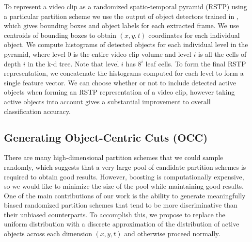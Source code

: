 \documentclass{bmvc2k}
\begin{document}
  To represent a video clip as a randomized spatio-temporal pyramid (RSTP)
  using a particular partition scheme we use the output of object detectors
  trained in \cite{Ramanan12}, which gives bounding boxes and object
  labels for each extracted frame. We use centroids of bounding boxes to
  obtain $(x,y,t)$ coordinates for each individual object.
  We compute histograms of detected
  objects for each individual level in the pyramid,
  where level 0 is the entire video clip volume and level $i$ is all the
  cells of depth $i$ in the k-d tree. 
  Note that level $i$ has $8^i$ leaf
  cells. To form the final RSTP representation, we concatenate the
  histograms computed for each level to form a single feature vector.
  We can choose whether or not to include detected active objects when
  forming an RSTP representation of a video clip, however taking active
  objects into account gives a substantial improvement to overall
  classification accuracy.
  
  \subsection{Generating Object-Centric Cuts (OCC)}
  There are many high-dimensional partition schemes that we could sample
  randomly, which suggests that a very large pool of candidate partition
  schemes is required to obtain good results. However, boosting is
  computationally expensive, so we would like to minimize the size of the
  pool while maintaining good results.
  One of the main contributions of our work is the ability to generate
  meaningfully biased randomized partition schemes that tend to be more discriminative
  than their unbiased counterparts.
  To accomplish this, we propose to replace the uniform distribution with a discrete
  approximation of the distribution of active objects across each dimension
  $(x, y, t)$
  and otherwise proceed normally.
\end{document}
